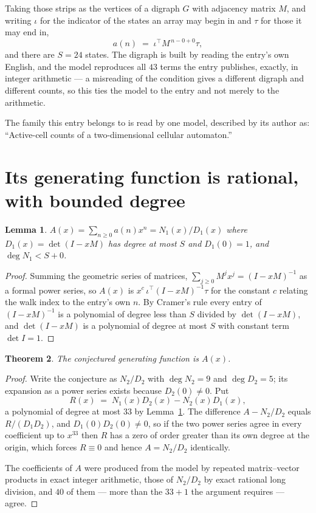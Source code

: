 \documentclass[11pt,a4paper]{article}
\theoremstyle{plain}
\newtheorem{theorem}{Theorem}
\newtheorem{lemma}[theorem]{Lemma}
\theoremstyle{definition}
\begin{document}
Taking those strips as the vertices of a digraph $G$ with adjacency matrix $M$, and writing
$\iota$ for the indicator of the states an array may begin in and $\tau$ for those it may end
in,
\[
a(n)\;=\;\iota^{\!\top}M^{\,n-0+0}\tau ,
\]
and there are $S=24$ states. The digraph is built by reading the entry's own English, and the
model reproduces all $43$ terms the entry publishes, exactly, in integer arithmetic --- a
misreading of the condition gives a different digraph and different counts, so this ties the
model to the entry and not merely to the arithmetic.

The family this entry belongs to is read by one model, described by its author as: ``Active-cell counts of a two-dimensional cellular automaton.''


\section{Its generating function is rational, with bounded degree}

\begin{lemma}\label{lem:rat}
$A(x)=\sum_{n\ge0}a(n)x^n=N_1(x)/D_1(x)$ where $D_1(x)=\det(I-xM)$ has degree at most
$S$ and $D_1(0)=1$, and $\deg N_1<S+0$.
\end{lemma}

\begin{proof}
Summing the geometric series of matrices, $\sum_{j\ge0}M^jx^j=(I-xM)^{-1}$ as a formal
power series, so $A(x)$ is $x^{c}\,\iota^{\!\top}(I-xM)^{-1}\tau$ for the constant $c$
relating the walk index to the entry's own $n$. By Cramer's rule every entry of
$(I-xM)^{-1}$ is a polynomial of degree less than $S$ divided by $\det(I-xM)$, and
$\det(I-xM)$ is a polynomial of degree at most $S$ with constant term $\det I=1$.
\end{proof}

\begin{theorem}
The conjectured generating function is $A(x)$.
\end{theorem}

\begin{proof}
Write the conjecture as $N_2/D_2$ with $\deg N_2=9$ and $\deg D_2=5$; its expansion as a
power series exists because $D_2(0)\neq0$. Put
\[
R(x)\;=\;N_1(x)D_2(x)-N_2(x)D_1(x),
\]
a polynomial of degree at most $33$ by Lemma~\ref{lem:rat}. The difference
$A-N_2/D_2$ equals $R/(D_1D_2)$, and $D_1(0)D_2(0)\neq0$, so if the two power series agree in
every coefficient up to $x^{33}$ then $R$ has a zero of order greater than its own
degree at the origin, which forces $R\equiv0$ and hence $A=N_2/D_2$ identically.

The coefficients of $A$ were produced from the model by repeated matrix--vector products in
exact integer arithmetic, those of $N_2/D_2$ by exact rational long division, and $40$
of them --- more than the $33+1$ the argument requires --- agree.
\end{proof}
\end{document}
